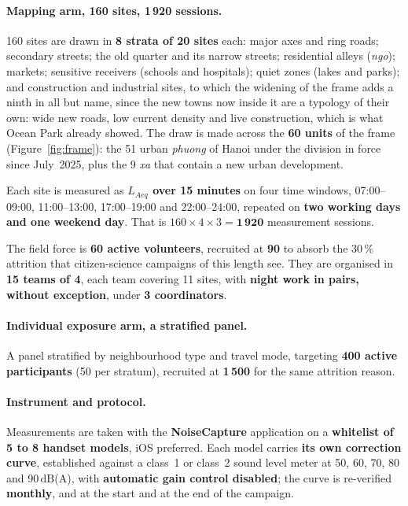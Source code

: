 \documentclass[11pt,a4paper]{article}
\newcommand{\dB}{\ensuremath{\,\mathrm{dB}}}
\begin{document}
\paragraph{Mapping arm, 160 sites, 1\,920 sessions.} 160 sites are drawn in
\textbf{8 strata of 20 sites} each: major axes and ring roads; secondary
streets; the old quarter and its narrow streets; residential alleys
(\emph{ngo}); markets; sensitive receivers (schools and hospitals); quiet zones
(lakes and parks); and construction and industrial sites, to which the
widening of the frame adds a ninth in all but name, since the new towns now
inside it are a typology of their own: wide new roads, low current density and
live construction, which is what Ocean Park already showed. The draw is made
across the \textbf{60 units} of the frame (Figure~\ref{fig:frame}): the 51
urban \emph{phuong} of Hanoi under the division in force since July~2025, plus
the 9 \emph{xa} that contain a new urban development.

Each site is measured as \textbf{$L_{Aeq}$ over 15 minutes} on four time
windows, 07:00--09:00, 11:00--13:00, 17:00--19:00 and 22:00--24:00,
repeated on \textbf{two working days and one weekend day}. That is
$160 \times 4 \times 3 = \mathbf{1\,920}$ measurement sessions.

The field force is \textbf{60 active volunteers}, recruited at \textbf{90} to
absorb the 30\,\% attrition that citizen-science campaigns of this length see.
They are organised in \textbf{15 teams of 4}, each team covering 11 sites, with
\textbf{night work in pairs, without exception}, under \textbf{3 coordinators}.

\paragraph{Individual exposure arm, a stratified panel.} A panel stratified
by neighbourhood type and travel mode, targeting \textbf{400 active
participants} (50 per stratum), recruited at \textbf{1\,500} for the same
attrition reason.

\paragraph{Instrument and protocol.} Measurements are taken with the
\textbf{NoiseCapture} application on a \textbf{whitelist of 5 to 8 handset
models}, iOS preferred. Each model carries \textbf{its own correction curve},
established against a class~1 or class~2 sound level meter at 50, 60, 70, 80 and
90\dB(A), with \textbf{automatic gain control disabled}; the curve is
re-verified \textbf{monthly}, and at the start and at the end of the campaign.
\end{document}
